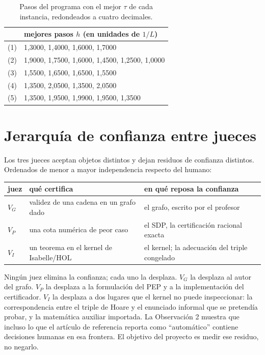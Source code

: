 \documentclass[11pt,a4paper]{article}
\begin{document}
\begin{table}[!ht]
\centering
\footnotesize
\setlength{\tabcolsep}{4pt}
\begin{tabular}{@{}ll@{}}
\toprule
& mejores pasos $h$ (en unidades de $1/L$) \\
\midrule
(1) & 1{,}3000, 1{,}4000, 1{,}6000, 1{,}7000 \\
(2) & 1{,}9000, 1{,}7500, 1{,}6000, 1{,}4500, 1{,}2500, 1{,}0000 \\
(3) & 1{,}5500, 1{,}6500, 1{,}6500, 1{,}5500 \\
(4) & 1{,}3500, 2{,}0500, 1{,}3500, 2{,}0500 \\
(5) & 1{,}3500, 1{,}9500, 1{,}9900, 1{,}9500, 1{,}3500 \\
\bottomrule
\end{tabular}
\caption{Pasos del programa con el mejor $\tau$ de cada instancia, redondeados a cuatro decimales.}
\label{tab:pasos}
\end{table}

\section{Jerarquía de confianza entre jueces}

Los tres jueces aceptan objetos distintos y dejan residuos de confianza distintos. Ordenados de menor a mayor independencia respecto del humano:

\begin{center}
\begin{tabular}{@{}lll@{}}
\toprule
juez & qué certifica & en qué reposa la confianza \\
\midrule
$V_G$ & validez de una cadena en un grafo dado & el grafo, escrito por el profesor \\
$V_P$ & una cota numérica de peor caso & el SDP, la certificación racional exacta \\
$V_I$ & un teorema en el kernel de Isabelle/HOL & el kernel; la adecuación del triple congelado \\
\bottomrule
\end{tabular}
\end{center}

Ningún juez elimina la confianza; cada uno la desplaza. $V_G$ la desplaza al autor del grafo. $V_P$ la desplaza a la formulación del PEP y a la implementación del certificador. $V_I$ la desplaza a dos lugares que el kernel no puede inspeccionar: la correspondencia entre el triple de Hoare y el enunciado informal que se pretendía probar, y la matemática auxiliar importada. La Observación 2 muestra que incluso lo que el artículo de referencia reporta como ``automático'' contiene decisiones humanas en esa frontera. El objetivo del proyecto es medir ese residuo, no negarlo.
\end{document}
